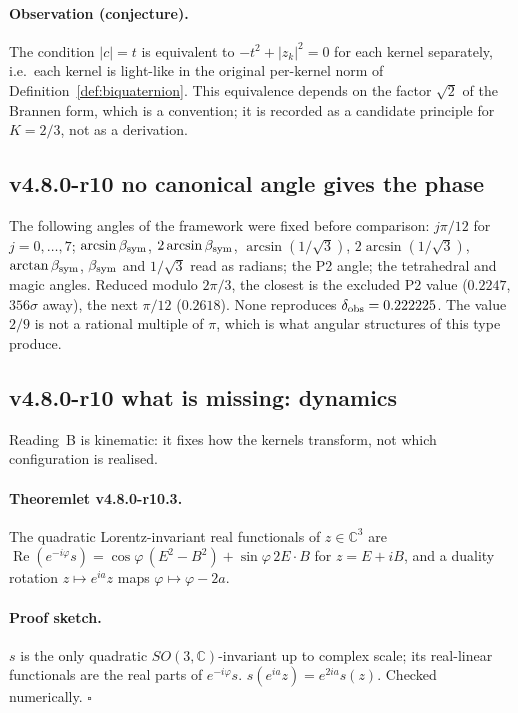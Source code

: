 \paragraph{Observation (conjecture).}
The condition \(|c|=t\) is equivalent to \(-t^2+|z_k|^2=0\) for each kernel separately, i.e.\ each
kernel is light-like in the original per-kernel norm of Definition~\ref{def:biquaternion}.  This
equivalence depends on the factor \(\sqrt2\) of the Brannen form, which is a convention; it is
recorded as a candidate principle for \(K=2/3\), not as a derivation.

\subsection*{v4.8.0-r10 no canonical angle gives the phase}
\label{subsec:v480-r10-phase}

The following angles of the framework were fixed before comparison: \(j\pi/12\) for \(j=0,\dots,7\);
\(\arcsin\beta_{\mathrm{sym}}\), \(2\arcsin\beta_{\mathrm{sym}}\), \(\arcsin(1/\sqrt3)\), \(2\arcsin(1/\sqrt3)\), \(\arctan\beta_{\mathrm{sym}}\),
\(\beta_{\mathrm{sym}}\) and \(1/\sqrt3\) read as radians; the P2 angle; the tetrahedral and magic angles.  Reduced
modulo \(2\pi/3\), the closest is the excluded P2 value (\(0.2247\), \(356\sigma\) away), the next
\(\pi/12\) (\(0.2618\)).  None reproduces \(\delta_{\rm obs}=0.222225\).  The value \(2/9\) is not a
rational multiple of \(\pi\), which is what angular structures of this type produce.

\subsection*{v4.8.0-r10 what is missing: dynamics}
\label{subsec:v480-r10-dynamics}

Reading~B is kinematic: it fixes how the kernels transform, not which configuration is realised.

\paragraph{Theoremlet v4.8.0-r10.3.}
The quadratic Lorentz-invariant real functionals of \(z\in\mathbb C^3\) are
\(\operatorname{Re}(e^{-i\varphi}s)=\cos\varphi\,(E^2-B^2)+\sin\varphi\,2E\cdot B\) for \(z=E+iB\), and a
duality rotation \(z\mapsto e^{ia}z\) maps \(\varphi\mapsto\varphi-2a\).

\paragraph{Proof sketch.}
\(s\) is the only quadratic \(SO(3,\mathbb C)\)-invariant up to complex scale; its real-linear functionals
are the real parts of \(e^{-i\varphi}s\).  \(s(e^{ia}z)=e^{2ia}s(z)\).  Checked numerically.  \(\square\)

